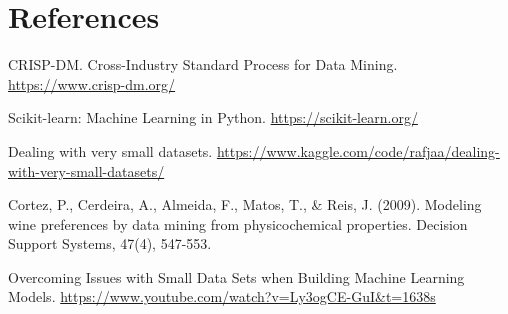 \documentclass[twocolumn]{article}
\begin{document}
	\section{References}
	\begin{enumerate}[label={[\arabic{*}]}]
		\item CRISP-DM. Cross-Industry Standard Process for Data Mining. \url{https://www.crisp-dm.org/}

		\item Scikit-learn: Machine Learning in Python. \url{https://scikit-learn.org/}

		\item Dealing with very small datasets.
			\url{https://www.kaggle.com/code/rafjaa/dealing-with-very-small-datasets/}

		\item Cortez, P., Cerdeira, A., Almeida, F., Matos, T., \& Reis, J. (2009).
			Modeling wine preferences by data mining from physicochemical properties. Decision
			Support Systems, 47(4), 547-553.

		\item Overcoming Issues with Small Data Sets when Building Machine Learning Models.
			\url{https://www.youtube.com/watch?v=Ly3ogCE-GuI&t=1638s}
	\end{enumerate}
\end{document}
